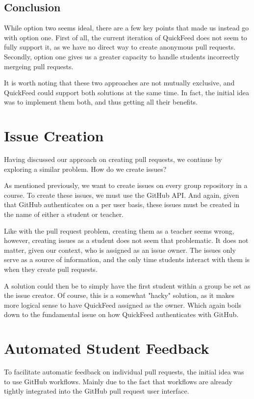 \subsection{Conclusion}

While option two seems ideal, there are a few key points that made us instead go with option one.
First of all, the current iteration of QuickFeed does not seem to fully support it, as we have no direct way to create anonymous pull requests.
Secondly, option one gives us a greater capacity to handle students incorrectly mergeing pull requests.

It is worth noting that these two approaches are not mutually exclusive, and QuickFeed could support both solutions at the same time.
In fact, the initial idea was to implement them both, and thus getting all their benefits.

\section{Issue Creation}

Having discussed our approach on creating pull requests, we continue by exploring a similar problem.
How do we create issues?

As mentioned previously, we want to create issues on every group repository in a course.
To create these issues, we must use the GitHub API.
And again, given that GitHub authenticates on a per user basis, these issues must be created in the name of either a student or teacher.

Like with the pull request problem, creating them as a teacher seems wrong, however, creating issues as a student does not seem that problematic.
It does not matter, given our context, who is assigned as an issue owner.
The issues only serve as a source of information, and the only time students interact with them is when they create pull requests.

A solution could then be to simply have the first student within a group be set as the issue creator.
Of course, this is a somewhat "hacky" solution, as it makes more logical sense to have QuickFeed assigned as the owner.
Which again boils down to the fundamental issue on how QuickFeed authenticates with GitHub.

\section{Automated Student Feedback}

To facilitate automatic feedback on individual pull requests, the initial idea was to use GitHub workflows.
Mainly due to the fact that workflows are already tightly integrated into the GitHub pull request user interface.

